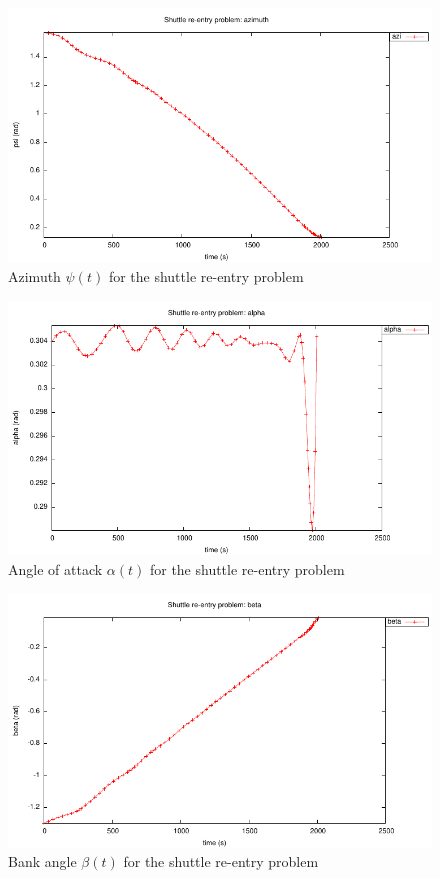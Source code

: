\documentclass[a4paper,11pt]{report}    %
\begin{document}
\begin{figure}
  \centering 
  \includegraphics{../examples/shutt/shutt_azi}
  \caption{Azimuth $\psi(t)$ for the shuttle re-entry problem}
 \label{fig:shutt_azi}
\end{figure}

\begin{figure}
  \centering
  \includegraphics{../examples/shutt/shutt_alpha}
  \caption{Angle of attack $\alpha(t)$ for the shuttle re-entry problem}
 \label{fig:shutt_alpha}
\end{figure}

\begin{figure}
  \centering
  \includegraphics{../examples/shutt/shutt_beta}
  \caption{Bank angle $\beta(t)$ for the shuttle re-entry problem}
 \label{fig:shutt_beta}
\end{figure}
\end{document}
